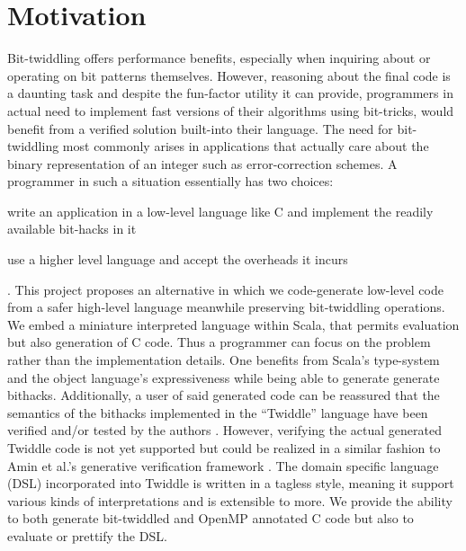 \documentclass{article}
\begin{document}
\section{Motivation}
Bit-twiddling offers performance benefits, especially when inquiring about or operating on bit patterns themselves. However, reasoning about the final code is a daunting task and despite the fun-factor utility it can provide, programmers in actual need to implement fast versions of their algorithms using bit-tricks, would benefit from a verified solution built-into their language. The need for bit-twiddling most commonly arises in applications that actually care about the binary representation of an integer such as error-correction schemes. A programmer in such a situation essentially has two choices:
\begin{enumerate*}[label=(\arabic*)]
	\item write an application in a low-level language like C and implement the readily available bit-hacks in it
	\item use a higher level language and accept the overheads it incurs
\end{enumerate*}. This project proposes an alternative in which we code-generate low-level code from a safer high-level language meanwhile preserving bit-twiddling operations. We embed a miniature interpreted language within Scala, that permits evaluation but also generation of C code. Thus a programmer can focus on the problem rather than the implementation details. One benefits from Scala's type-system and the object language's expressiveness while being able to generate generate bithacks. Additionally, a user of said generated code can be reassured that the semantics of the bithacks implemented in the ``Twiddle'' language have been verified and/or tested by the authors \cite{anderson2005bit}. However, verifying the actual generated Twiddle code is not yet supported but could be realized in a similar fashion to Amin et al.'s generative verification framework \cite{amin2017lms}.
The domain specific language (DSL) incorporated into Twiddle is written in a tagless style, meaning it support various kinds of interpretations and is extensible to more. We provide the ability to both generate bit-twiddled and OpenMP annotated C code but also to evaluate or prettify the DSL.

\pagebreak
\end{document}

